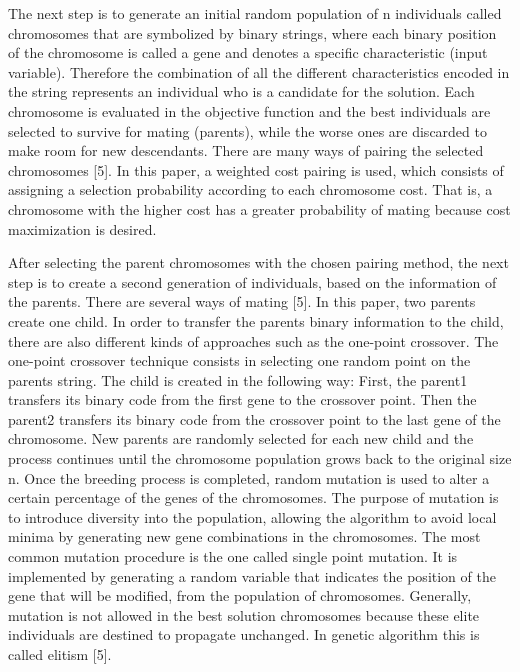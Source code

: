 The next step is to generate an initial random population of n individuals called chromosomes that 
are symbolized by binary strings, where each binary position of the chromosome is called a gene and 
denotes a specific characteristic (input variable). Therefore the combination of all the different 
characteristics encoded in the string represents an individual who is a candidate for the solution.
Each chromosome is evaluated in the objective function and the best individuals are selected to 
survive for mating (parents), while the worse ones are discarded to make room for new descendants.  
There are many ways of pairing the selected chromosomes [5]. In this paper, a weighted cost pairing 
is used, which consists of assigning a selection probability according to each chromosome cost. That 
is, a chromosome with the higher cost has a greater probability of mating because cost maximization 
is desired.

After selecting the parent chromosomes with the chosen pairing method, the next step is to create a 
second generation of individuals, based on the information of the parents. There are several ways of 
mating [5]. In this paper, two parents create one child. 
In order to transfer the parents binary information to the child, there are also different kinds 
of approaches such as the one-point crossover. The one-point crossover technique consists in 
selecting one random point on the parents string. The child is created in the following way: First, 
the parent1 transfers its binary code from the first gene to the crossover point. Then the parent2 
transfers its binary code from the crossover point to the last gene of the chromosome. New parents 
are randomly selected for each new child and the process continues until the chromosome population 
grows back to the original size n. 
Once the breeding process is completed, random mutation is used to alter a certain percentage of the 
genes of the chromosomes. The purpose of mutation is to introduce diversity into the population, 
allowing the algorithm to avoid local minima by generating new gene combinations in the chromosomes. 
The most common mutation procedure is the one called single point mutation. It is implemented by 
generating a random variable that indicates the position of the gene that will be modified, from the 
population of chromosomes. Generally, mutation is not allowed in the best solution chromosomes 
because these elite individuals are destined to propagate unchanged. In genetic algorithm this 
is called elitism [5].

